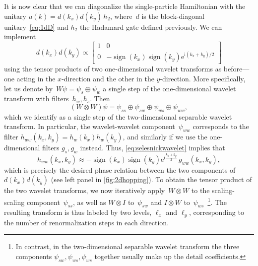 \documentclass[aps,pra,reprint,superscriptaddress,floatfix,amsmath,amssymb,amsfonts]{revtex4-1}
\DeclareMathOperator{\sign}{sign}
\newcommand*{\rmi}{\mathrm{i}}
\newcommand*{\rme}{\mathrm{e}}
\newcommand*{\ot}{\otimes}
\newcommand*{\op}{\oplus}
\begin{document}
It is now clear that we can diagonalize the single-particle Hamiltonian with the unitary $u(k) = d(k_x) d(k_y) \, h_2$,
where~$d$ is the block-diagonal unitary~\eqref{eq:1dD} and $h_2$ the Hadamard gate defined previously.
We can implement
\begin{equation}\label{eq:2dD}
d(k_x) d(k_y) \propto \begin{bmatrix} 1 & 0\\ 0 & - \sign(k_x)\sign(k_y)\rme^{\rmi (k_x+k_y)/2}\end{bmatrix}
\end{equation}
using the tensor products of two one-dimensional wavelet transforms as before---one acting in the $x$-direction and the other in the $y$-direction.
More specifically, let us denote by~$W \psi = \psi_s \op \psi_w$ a single step of the one-dimensional wavelet transform with filters~$h_w,h_s$.
Then
\begin{equation}\label{eq:outputWW}
  (W \ot W) \psi = \psi_{ss} \op \psi_{sw} \op \psi_{ws} \op \psi_{ww},
\end{equation}
which we identify as a single step of the two-dimensional separable wavelet transform.
In particular, the wavelet-wavelet component~$\psi_{ww}$ corresponds to the filter $h_{ww}(k_x,k_y)=h_w(k_x)h_w(k_y)$, and similarly if we use the one-di\-men\-si\-o\-nal filters $g_s,g_w$ instead.
Thus, \cref{eq:selesnickwavelet} implies that
\begin{equation*}
  h_{ww}(k_x,k_y) \approx -\sign(k_x)\sign(k_y) \rme^{\rmi \frac{k_x+k_y}{2}} \,g_{ww}(k_x,k_y),
\end{equation*}
which is precisely the desired phase relation between the two components of $d(k_x) d(k_y)$ (see left panel in \cref{fig:2dhopping}).
To obtain the tensor product of the two wavelet transforms, we now iteratively apply~$W\ot W$ to the scaling-scaling component~$\psi_{ss}$, as well as $W \ot I$ to~$\psi_{sw}$ and $I \ot W$ to~$\psi_{ws}$~\footnote{In contrast, in the two-dimensional separable wavelet transform the three components $\psi_{sw},\psi_{ws},\psi_{ws}$ together usually make up the detail coefficients.}.
The resulting transform is thus labeled by two levels, $\ell_x$ and $\ell_y$, corresponding to the number of renormalization steps in each direction.
\end{document}
